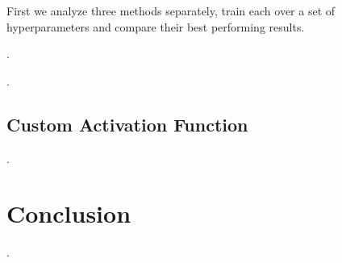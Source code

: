 \documentclass{article}
\begin{document}
First we analyze three methods separately, train each over a set of hyperparameters and compare their best performing results.

\questionSeven.

\questionEight.

\subsection{Custom Activation Function}

\questionNine.

\section{Conclusion}
\label{sec:concl}
    
\questionTen.

\newpage

\end{document}
